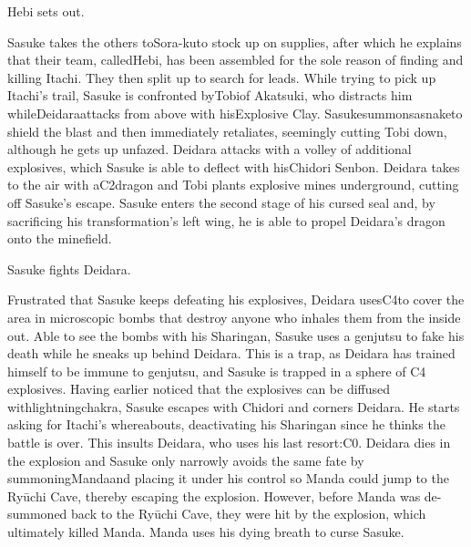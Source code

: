 \documentclass[a4paper,12pt]{article}
\begin{document}
Hebi sets out.\\ \par \vspace{0.5cm}

Sasuke takes the others toSora-kuto stock up on supplies, after which he explains that their team, calledHebi, has been assembled for the sole reason of finding and killing Itachi. They then split up to search for leads. While trying to pick up Itachi's trail, Sasuke is confronted byTobiof Akatsuki, who distracts him whileDeidaraattacks from above with hisExplosive Clay. Sasukesummonsasnaketo shield the blast and then immediately retaliates, seemingly cutting Tobi down, although he gets up unfazed. Deidara attacks with a volley of additional explosives, which Sasuke is able to deflect with hisChidori Senbon. Deidara takes to the air with aC2dragon and Tobi plants explosive mines underground, cutting off Sasuke's escape. Sasuke enters the second stage of his cursed seal and, by sacrificing his transformation's left wing, he is able to propel Deidara's dragon onto the minefield.\\ \par \vspace{0.5cm}

Sasuke fights Deidara.\\ \par \vspace{0.5cm}

Frustrated that Sasuke keeps defeating his explosives, Deidara usesC4to cover the area in microscopic bombs that destroy anyone who inhales them from the inside out. Able to see the bombs with his Sharingan, Sasuke uses a genjutsu to fake his death while he sneaks up behind Deidara. This is a trap, as Deidara has trained himself to be immune to genjutsu, and Sasuke is trapped in a sphere of C4 explosives. Having earlier noticed that the explosives can be diffused withlightningchakra, Sasuke escapes with Chidori and corners Deidara. He starts asking for Itachi's whereabouts, deactivating his Sharingan since he thinks the battle is over. This insults Deidara, who uses his last resort:C0. Deidara dies in the explosion and Sasuke only narrowly avoids the same fate by summoningMandaand placing it under his control so Manda could jump to the Ryūchi Cave, thereby escaping the explosion. However, before Manda was de-summoned back to the Ryūchi Cave, they were hit by the explosion, which ultimately killed Manda. Manda uses his dying breath to curse Sasuke.\\ \par \vspace{0.5cm}
\end{document}
